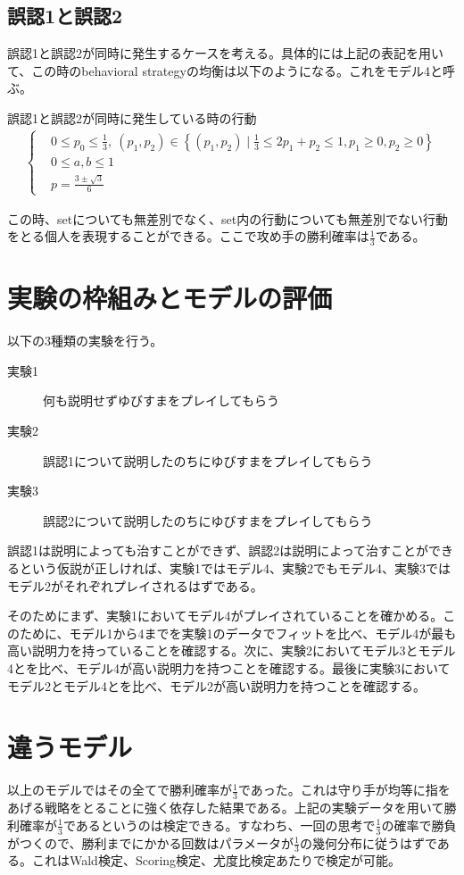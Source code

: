 \documentclass{jsarticle}
\begin{document}
\subsection{誤認1と誤認2}
誤認1と誤認2が同時に発生するケースを考える。具体的には上記の表記を用いて、この時のbehavioral strategyの均衡は以下のようになる。これをモデル4と呼ぶ。
\begin{itembox}[l]{誤認1と誤認2が同時に発生している時の行動}
\begin{align}
	\begin{cases}
    	&0 \leq p_0 \leq \frac{1}{3}, \ (p_1, p_2) \in \left\{ (p_1, p_2) \mid \frac{1}{3} \leq 2p_1 + p_2 \leq 1, p_1 \geq 0, p_2 \geq 0\right\}\\[10pt]
	&0 \leq a, b \leq 1\\[10pt]
	&p = \frac{3\pm \sqrt{3}}{6}
	\end{cases}
\end{align}
\end{itembox}
この時、setについても無差別でなく、set内の行動についても無差別でない行動をとる個人を表現することができる。ここで攻め手の勝利確率は$\frac{1}{3}$である。

\section{実験の枠組みとモデルの評価}
以下の3種類の実験を行う。
\begin{description}
	\item[実験1] 何も説明せずゆびすまをプレイしてもらう
	\item[実験2] 誤認1について説明したのちにゆびすまをプレイしてもらう
	\item[実験3] 誤認2について説明したのちにゆびすまをプレイしてもらう
\end{description}
誤認1は説明によっても治すことができず、誤認2は説明によって治すことができるという仮説が正しければ、実験1ではモデル4、実験2でもモデル4、実験3ではモデル2がそれぞれプレイされるはずである。

そのためにまず、実験1においてモデル4がプレイされていることを確かめる。このために、モデル1から4までを実験1のデータでフィットを比べ、モデル4が最も高い説明力を持っていることを確認する。次に、実験2においてモデル3とモデル4とを比べ、モデル4が高い説明力を持つことを確認する。最後に実験3においてモデル2とモデル4とを比べ、モデル2が高い説明力を持つことを確認する。

\section{違うモデル}
以上のモデルではその全てで勝利確率が$\frac{1}{3}$であった。これは守り手が均等に指をあげる戦略をとることに強く依存した結果である。上記の実験データを用いて勝利確率が$\frac{1}{3}$であるというのは検定できる。すなわち、一回の思考で$\frac{1}{3}$の確率で勝負がつくので、勝利までにかかる回数はパラメータが$\frac{1}{3}$の幾何分布に従うはずである。これはWald検定、Scoring検定、尤度比検定あたりで検定が可能。
\end{document}
